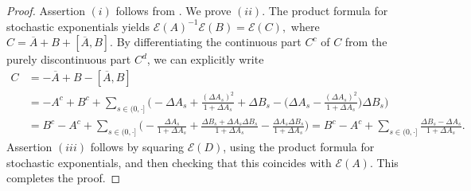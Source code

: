 \documentclass[10pt]{article} %
\newcommand\cE{\mathcal E}
\newcommand{\1}{\mathbf{1}}
\begin{document}
\begin{proof}
Assertion $(i)$ follows from \cite[Lemma 4.4]{cohen2012existence}. We prove $(ii)$. The product formula for stochastic exponentials yields $\cE(A)^{-1}\cE(B) = \cE(C),$ where $C = \overline A + B + [\overline A,B]$. By differentiating the continuous part $C^c$ of $C$ from the purely discontinuous part $C^d$, we can explicitly write
\begin{align*}
			C &= -\overline A + B - [\overline A,B] \\
			&= -A^c + B^c + \sum_{s \in (0,\cdot]} \bigg(-\Delta A_s + \frac{(\Delta A_s)^2}{1+\Delta A_s} + \Delta B_s - \bigg(\Delta A_s - \frac{(\Delta A_s)^2}{1+\Delta A_s}\bigg)\Delta B_s\bigg) \\
			&= B^c - A^c + \sum_{s \in (0,\cdot]} \bigg(-\frac{\Delta A_s}{1+\Delta A_s} + \frac{\Delta B_s + \Delta A_s \Delta B_s}{1+\Delta A_s} - \frac{\Delta A_s \Delta B_s}{1+\Delta A_s}\bigg) = B^c - A^c + \sum_{s \in (0,\cdot]} \frac{\Delta B_s - \Delta A_s}{1+\Delta A_s}.
\end{align*}
Assertion $(iii)$ follows by squaring $\cE(D)$, using the product formula for stochastic exponentials, and then checking that this coincides with $\cE(A)$. This completes the proof.
\end{proof}
\end{document}

